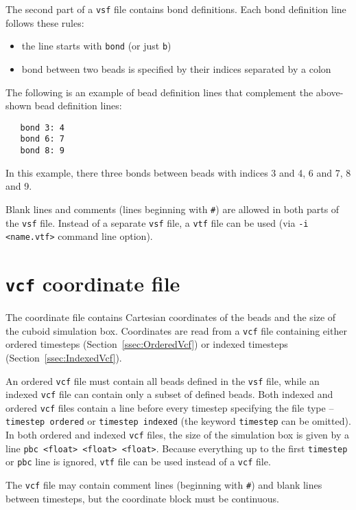 The second part of a \texttt{vsf} file contains bond definitions.  Each
bond definition line follows these rules:

\begin{itemize}[topsep=0pt,itemsep=0pt]
  \item the line starts with \texttt{bond} (or just \texttt{b})
  \item bond between two beads is specified by their indices separated by a
    colon
\end{itemize}

The following is an example of bead definition lines that complement the
above-shown bead definition lines:

\begin{verbatim}
   bond 3: 4
   bond 6: 7
   bond 8: 9
\end{verbatim}

In this example, there three bonds between beads with indices 3 and 4, 6
and 7, 8 and 9.

Blank lines and comments (lines beginning with \texttt{\#}) are allowed in
both parts of the \texttt{vsf} file. Instead of a separate \texttt{vsf}
file, a \texttt{vtf} file can be used (via \texttt{-i <name.vtf>} command
line option).

\section{\texttt{vcf} coordinate file} \label{sec:CoordinateVcf}

The coordinate file contains Cartesian coordinates of the beads and the
size of the cuboid simulation box.
Coordinates are read from a \texttt{vcf} file
containing either ordered timesteps (Section~\ref{ssec:OrderedVcf}) or
indexed timesteps (Section~\ref{ssec:IndexedVcf}).

An ordered \texttt{vcf} file must contain all beads defined in the
\texttt{vsf} file, while an indexed \texttt{vcf} file can contain only a
subset of defined beads. Both indexed and ordered \texttt{vcf} files
contain a line before every timestep specifying the file type --
\texttt{timestep ordered} or \texttt{timestep indexed} (the keyword
\texttt{timestep} can be omitted).  In both ordered and indexed
\texttt{vcf} files, the size of the simulation box is given by a line
\texttt{pbc <float> <float> <float>}. Because everything up to the first
\texttt{timestep} or \texttt{pbc} line is ignored, \texttt{vtf} file can be
used instead of a \texttt{vcf} file.

The \texttt{vcf} file may contain comment lines (beginning with
\texttt{\#}) and blank lines between timesteps, but the coordinate block
must be continuous.

